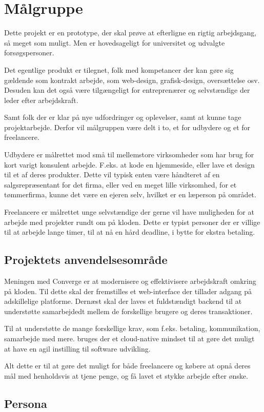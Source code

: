 \chapter{Målgruppe}

Dette projekt er en prototype, der skal prøve at efterligne en rigtig arbejdsgang, så meget som muligt. Men er hovedsageligt for universitet og udvalgte forsøgspersoner.

Det egentlige produkt er tilegnet, folk med kompetancer der kan gøre sig gældende som kontrakt arbejde, som web-design, grafisk-design, oversættelse osv. Desuden kan det også være tilgængeligt for entreprenærer og selvstændige der leder efter arbejdskraft.

Samt folk der er klar på nye udfordringer og oplevelser, samt at kunne tage projektarbejde. Derfor vil målgruppen være delt i to, et for udbydere og et for freelancere. 

Udbydere er målrettet mod små til mellemstore virksomheder som har brug for kort varigt konsulent arbejde. F.eks. at kode en hjemmeside, eller lave et design til et af deres produkter. Dette vil typisk enten være håndteret af en salgsrepræsentant for det firma, eller ved en meget lille virksomhed, for et tømmerfirma, kunne det være en ejeren selv, hvilket er en læperson på området.

Freelancere er målrettet unge selvstændige der gerne vil have muligheden for at arbejde med projekter rundt om på kloden. Dette er typist personer der er villige til at arbejde lange timer, til at nå en hård deadline, i bytte for ekstra betaling.

\section{Projektets anvendelsesområde}

Meningen med Converge er at modernisere og effektivisere arbejdskraft omkring på kloden. Til dette skal der fremstilles et web-interface der tillader adgang på adskillelige platforme. Dernæst skal der laves et fuldstændigt backend til at understøtte samarbejdedt mellem de forskellige brugere og deres transaktioner.

Til at understøtte de mange forskellige krav, som f.eks. betaling, kommunikation, samarbejde med mere. bruges der et cloud-native mindset til at gøre det muligt at have en agil instilling til software udvikling.

Alt dette er til at gøre det muligt for både freelancere og købere at opnå deres mål med henholdsvis at tjene penge, og få lavet et stykke arbejde efter ønske.

\section{Persona}

